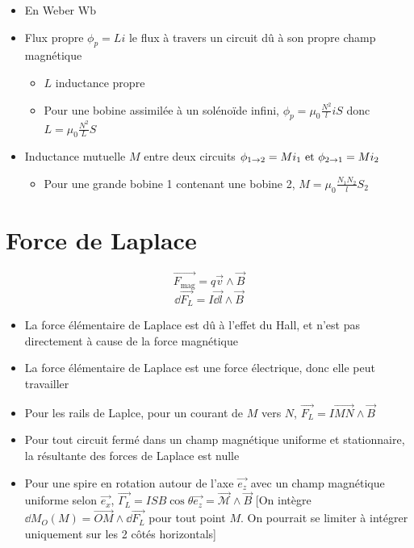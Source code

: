\documentclass[openany]{book}
\begin{document}
\begin{itemize}
    \item En Weber $\text{Wb}$
    \item Flux propre $\phi_p = Li$ le flux à travers un circuit dû à son propre champ magnétique
    \begin{itemize}
        \item $L$ inductance propre
        \item Pour une bobine assimilée à un solénoïde infini, $\phi_p = \mu_0 \frac{N^2}{l} i S$ donc $L = \mu_0 \frac{N^2}{L}S$
    \end{itemize}
    \item Inductance mutuelle $M$ entre deux circuits $\phi_{1 \rightarrow 2} = M i_1 \text{ et } \phi_{2 \rightarrow 1} = M i_2$ 
    \begin{itemize}
        \item Pour une grande bobine 1 contenant une bobine 2, $M = \mu_0 \frac{N_1 N_2}{l} S_2$
    \end{itemize}
\end{itemize}

\section{Force de Laplace}
\[ \overrightarrow{F_{\text{mag}}} = q \vec{v} \wedge \vec{B}  \]
\[ \dd \overrightarrow{F_{L}} = I \vec{\dd l} \wedge \vec{B} \]

\begin{itemize}
    \item La force élémentaire de Laplace est dû à l'effet du Hall, et n'est pas directement à cause de la force magnétique
    \item La force élémentaire de Laplace est une force électrique, donc elle peut travailler
    \item Pour les rails de Laplce, pour un courant de $M$ vers $N$, $\vec{F_L} = I \overrightarrow{MN} \wedge \vec{B}$
    \item Pour tout circuit fermé dans un champ magnétique uniforme et stationnaire, la résultante des forces de Laplace est nulle
    \item Pour une spire en rotation autour de l'axe $\vec{e_z}$ avec un champ magnétique uniforme selon $\vec{e_x}$, $\vec{\Gamma_L} = ISB \cos \theta \vec{e_z} = \vec{\mathcal{M}} \wedge \vec{B}$ [On intègre $\dd M_O(M) = \overrightarrow{OM} \wedge \dd \vec{F_L}$ pour tout point $M$. On pourrait se limiter à intégrer uniquement sur les 2 côtés horizontals]
\end{itemize}
\end{document}
